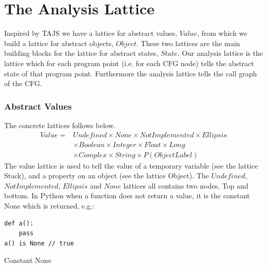 \chapter{The Analysis Lattice}
Inspired by TAJS we have a lattice for abstract values, $Value$, from which we build a lattice for abstract objects, $Object$. These two lattices are the main building blocks for the lattice for abstract states, $State$. Our analysis lattice is the lattice which for each program point (i.e. for each CFG node) tells the abstract state of that program point. Furthermore the analysis lattice tells the call graph of the CFG.

\subsection{Abstract Values}
The concrete lattices follows below.
\begin{eqnarray*}
Value =& Undefined \times None \times NotImplemented \times Ellipsis \\
	   & \times Boolean \times Integer \times Float \times Long \\
       & \times Complex \times String \times P(ObjectLabel)
\end{eqnarray*}
The value lattice is used to tell the value of a temporary variable (see the lattice Stack), and a property on an object (see the lattice Object). The $Undefined$, $NotImplemented$, $Ellipsis$ and $None$ lattices all contains two nodes, Top and bottom. In Python when a function does not return a value, it is the constant None\cite{pyref.constants} which is returned, e.g.:
\begin{listing}[H]
	\begin{verbatim}
def a(): 
	pass
a() is None // true
	\end{verbatim}
	\caption{Constant None}\label{code:NoneExample}
\end{listing}

